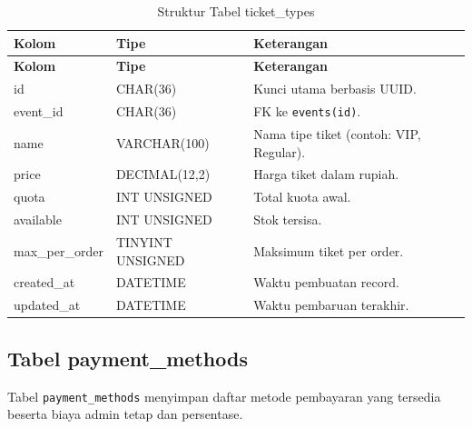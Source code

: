 \documentclass[12pt,a4paper]{report}
\begin{document}
\begin{longtable}{p{3.6cm} p{3.6cm} p{8.5cm}}
\caption{Struktur Tabel ticket\_types} \label{tab:ticket-types} \\
\toprule
\textbf{Kolom} & \textbf{Tipe} & \textbf{Keterangan} \\
\midrule
\endfirsthead
\toprule
\textbf{Kolom} & \textbf{Tipe} & \textbf{Keterangan} \\
\midrule
\endhead
\bottomrule
\endfoot
id              & CHAR(36)        & Kunci utama berbasis UUID. \\
event\_id       & CHAR(36)        & FK ke \texttt{events(id)}. \\
name            & VARCHAR(100)    & Nama tipe tiket (contoh: VIP, Regular). \\
price           & DECIMAL(12,2)   & Harga tiket dalam rupiah. \\
quota           & INT UNSIGNED    & Total kuota awal. \\
available       & INT UNSIGNED    & Stok tersisa. \\
max\_per\_order & TINYINT UNSIGNED & Maksimum tiket per order. \\
created\_at     & DATETIME        & Waktu pembuatan record. \\
updated\_at     & DATETIME        & Waktu pembaruan terakhir. \\
\end{longtable}

\subsection{Tabel payment\_methods}
Tabel \texttt{payment\_methods} menyimpan daftar metode pembayaran yang tersedia beserta biaya admin tetap dan persentase.
\end{document}
